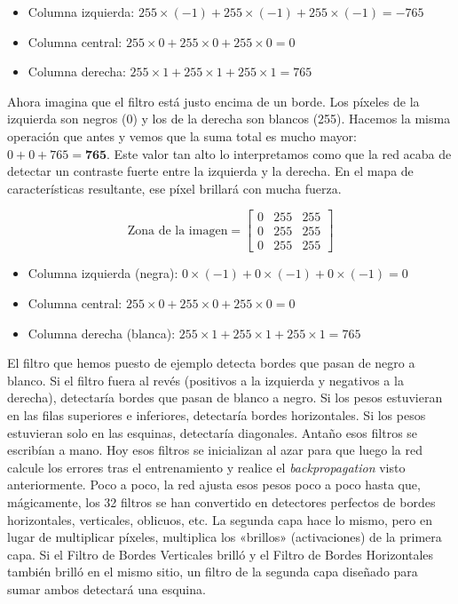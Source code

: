 \documentclass[a4paper,11pt]{article}
\begin{document}
\begin{itemize}

\item
  Columna izquierda:
  \(255 \times (-1) + 255 \times (-1) + 255 \times (-1) = -765\)
\item
  Columna central: \(255 \times 0 + 255 \times 0 + 255 \times 0 = 0\)
\item
  Columna derecha: \(255 \times 1 + 255 \times 1 + 255 \times 1 = 765\)
\end{itemize}

Ahora imagina que el filtro está justo encima de un borde. Los píxeles
de la izquierda son negros (0) y los de la derecha son blancos (255).
Hacemos la misma operación que antes y vemos que la suma total es mucho
mayor: \(0 + 0 + 765 = \mathbf{765}\). Este valor tan alto lo
interpretamos como que la red acaba de detectar un contraste fuerte
entre la izquierda y la derecha. En el mapa de características
resultante, ese píxel brillará con mucha fuerza.

\[
\text{Zona de la imagen} = \begin{bmatrix} 0 & 255 & 255 \\ 0 & 255 & 255 \\ 0 & 255 & 255 \end{bmatrix}
\]

\begin{itemize}

\item
  Columna izquierda (negra):
  \(0 \times (-1) + 0 \times (-1) + 0 \times (-1) = 0\)
\item
  Columna central: \(255 \times 0 + 255 \times 0 + 255 \times 0 = 0\)
\item
  Columna derecha (blanca):
  \(255 \times 1 + 255 \times 1 + 255 \times 1 = 765\)
\end{itemize}

El filtro que hemos puesto de ejemplo detecta bordes que pasan de negro
a blanco. Si el filtro fuera al revés (positivos a la izquierda y
negativos a la derecha), detectaría bordes que pasan de blanco a negro.
Si los pesos estuvieran en las filas superiores e inferiores, detectaría
bordes horizontales. Si los pesos estuvieran solo en las esquinas,
detectaría diagonales. Antaño esos filtros se escribían a mano. Hoy esos
filtros se inicializan al azar para que luego la red calcule los errores
tras el entrenamiento y realice el \emph{backpropagation} visto
anteriormente. Poco a poco, la red ajusta esos pesos poco a poco hasta
que, mágicamente, los 32 filtros se han convertido en detectores
perfectos de bordes horizontales, verticales, oblicuos, etc. La segunda
capa hace lo mismo, pero en lugar de multiplicar píxeles, multiplica los
«brillos» (activaciones) de la primera capa. Si el Filtro de Bordes
Verticales brilló y el Filtro de Bordes Horizontales también brilló en
el mismo sitio, un filtro de la segunda capa diseñado para sumar ambos
detectará una esquina.
\end{document}
